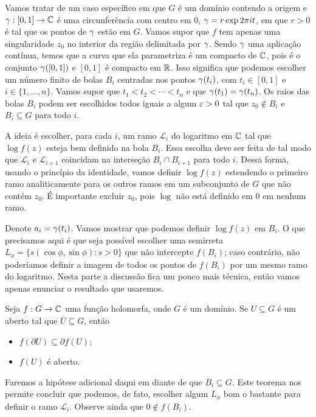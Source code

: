     Vamos tratar de um caso específico em que $G$ é um domínio contendo a origem e 
    $\gamma: [0,1] \to \mathbb{C}$ é uma circunferência com centro em $0$, $\gamma = r\exp{2 \pi i t}$, 
    em que $r > 0$ é tal que os pontos de $\gamma$ estão em $G$. Vamos supor que $f$ tem apenas 
    uma singularidade $z_0$ no interior da região delimitada por $\gamma$. Sendo $\gamma$ uma
    aplicação contínua, temos que a curva que ela parametriza é um compacto de $\mathbb{C}$, pois é o
    conjunto $\gamma([0,1])$ e $[0,1]$ é compacto em $\mathbb{R}$. Isso significa que podemos escolher um
    número finito de bolas $B_i$ centradas nos pontos $\gamma(t_i)$, com $t_i \in [0,1]$ e 
    $i \in \{1,\dots, n\}$. Vamos supor que $t_1 < t_2 < \cdots < t_n$ e que 
    $\gamma(t_1) = \gamma(t_n)$.  Os raios das bolas $B_i$ podem ser escolhidos todos iguais a
    algum $\varepsilon > 0$ tal que $z_0 \not \in B_i$ e $B_i \subseteq G$ para todo $i$.
    
    A ideia é escolher, para cada $i$, um ramo $\mathcal{L}_i$ do logaritmo em $\mathbb{C}$ tal que 
    $\log f(z)$ esteja bem definido na bola $B_i$. Essa escolha deve ser feita de tal modo que
    $\mathcal{L}_i$ e $\mathcal{L}_{i+1}$ coincidam na interseção $B_i \cap B_{i+1}$ para todo $i$.
    Dessa forma, usando o princípio da identidade, vamos definir $\log f(z)$ estendendo o primeiro
    ramo analiticamente para os outros ramos em um subconjunto de $G$ que não contém $z_0$. 
    É importante excluir $z_0$, pois $\log$ não está definido em $0$ em nenhum ramo.
    
    Denote $a_i = \gamma(t_i)$. Vamos mostrar que podemos definir $\log f(z)$ em $B_i$. 
    O que precisamos aqui é que seja possível escolher uma semirreta 
    $L_\phi = \{s(\cos \phi, \sin \phi): s > 0\}$ que não intercepte $f(B_i)$; caso contrário, 
    não poderíamos definir a imagem de todos os pontos de $f(B_i)$ por um mesmo ramo do logaritmo.
    Nesta parte a discussão fica um pouco mais técnica, então vamos apenas enunciar o resultado 
    que usaremos. 
    \begin{teorema}
        Seja $f: G \to \mathbb{C}$ uma função holomorfa, onde $G$ é um domínio. 
        Se $U \subseteq G$ é um aberto tal que $\overline{U} \subseteq G$, então
        \begin{itemize}
            \item $f(\partial U) \subseteq \partial f(U)$;
            \item $f(U)$ é aberto.
        \end{itemize}
    \end{teorema}
    Faremos a hipótese adicional daqui em diante de que $\overline{B}_i \subseteq G$. 
    Este teorema nos permite concluir que podemos, de fato, escolher algum $L_\phi$ 
    bom o bastante para definir o ramo $\mathcal{L}_i$. Observe ainda que $0 \not \in f(B_i)$.
    
